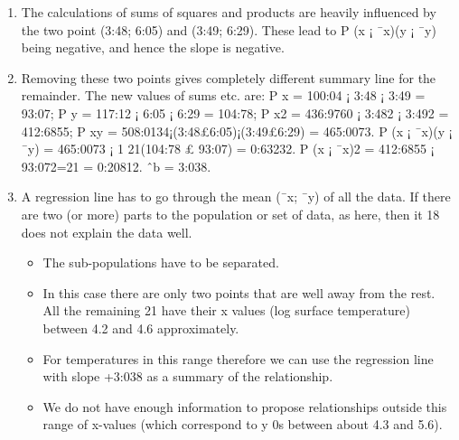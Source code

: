 \documentclass[a4paper,12pt]{article}
\begin{document}
\begin{enumerate}
    \item The calculations of sums of squares and products are heavily influenced by
the two point (3:48; 6:05) and (3:49; 6:29). These lead to
P
(x ¡ ¯x)(y ¡ ¯y)
being negative, and hence the slope is negative.
\item Removing these two points gives completely different summary line for the
remainder. The new values of sums etc. are:
P
x = 100:04 ¡ 3:48 ¡ 3:49 =
93:07;
P
y = 117:12 ¡ 6:05 ¡ 6:29 = 104:78;
P
x2 = 436:9760 ¡ 3:482 ¡
3:492 = 412:6855;
P
xy = 508:0134¡(3:48£6:05)¡(3:49£6:29) = 465:0073.
P
(x ¡ ¯x)(y ¡ ¯y) = 465:0073 ¡ 1
21(104:78 £ 93:07) = 0:63232.
P
(x ¡ ¯x)2 =
412:6855 ¡ 93:072=21 = 0:20812. ˆb = 3:038.
\item A regression line has to go through the mean (¯x; ¯y) of all the data. If there
are two (or more) parts to the population or set of data, as here, then it
18
does not explain the data well. 
\begin{itemize}
    \item The sub-populations have to be separated.
\item In this case there are only two points that are well away from the rest. All
the remaining 21 have their x values (log surface temperature) between 4.2
and 4.6 approximately.
\item For temperatures in this range therefore we can use
the regression line with slope +3:038 as a summary of the relationship. 
\item We
do not have enough information to propose relationships outside this range
of x-values (which correspond to y
0s between about 4.3 and 5.6).
\end{itemize}

\end{enumerate}
\end{document}
